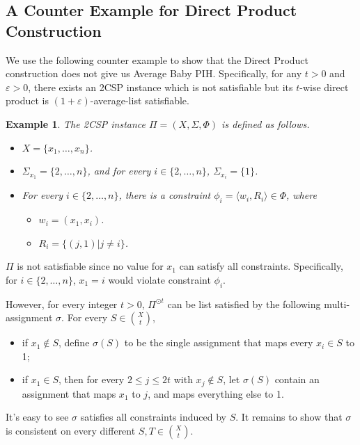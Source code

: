 \documentclass[10pt,a4paper]{article}
\newtheorem{example}[theorem]{Example}
\begin{document}
\subsection{A Counter Example for Direct Product Construction}

We use the following counter example to show that the Direct Product construction does not give us Average Baby PIH. Specifically, for any $t>0$ and $\varepsilon>0$, there exists an 2CSP instance which is not satisfiable but its $t$-wise direct product is $(1+\varepsilon)$-average-list satisfiable.

\begin{example}\label{ex:1}
    The 2CSP instance $\Pi=(X,\Sigma,\Phi)$ is defined as follows.
    \begin{itemize}
        \item $X=\{x_1,\ldots,x_n\}$.
        \item $\Sigma_{x_1}=\{2,\ldots,n\}$, and for every $i \in \{2,\ldots,n\}$, $\Sigma_{x_i}=\{1\}$.
        \item For every $i \in \{2,\ldots,n\}$, there is a constraint $\phi_i=\langle w_i,R_i\rangle \in \Phi$, where
        \begin{itemize}
            \item $w_i=(x_1,x_i)$.
            \item $R_i=\{(j,1) | j \ne i\}$.
        \end{itemize}
    \end{itemize}
    \end{example}
    $\Pi$ is not satisfiable since no value for $x_1$ can satisfy all constraints. Specifically, for $i \in \{2,\ldots,n\}$, $x_1=i$ would violate constraint $\phi_i$.

    However, for every integer $t>0$, $\Pi^{\odot t}$ can be list satisfied by the following multi-assignment $\sigma$. For every $S \in \binom{X}{t}$, 
    \begin{itemize}
        \item if $x_1 \notin S$, define $\sigma(S)$ to be the single assignment that maps every $x_i \in S$ to 1;
        \item if $x_1 \in S$, then for every $2 \le j \le 2t$ with $x_j \notin S$, let $\sigma(S)$ contain an assignment that maps $x_1$ to $j$, and maps everything else to 1.
    \end{itemize}
    
    It's easy to see $\sigma$ satisfies all constraints induced by $S$. It remains to show that $\sigma$ is consistent on every different $S,T \in \binom{X}{t}$. 
    
\end{document}
